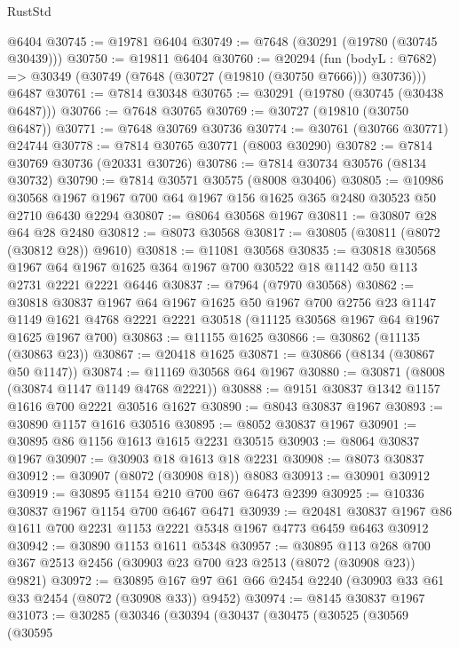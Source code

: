 \begin{lexlean}{RustStd}
\begin{coremodule}
    @6404
@30745 := @19781 @6404
@30749 := @7648 (@30291 (@19780 (@30745 @30439)))
@30750 := @19811 @6404
@30760 := @20294
    (fun (bodyL : @7682) => @30349 (@30749 (@7648 (@30727 (@19810 (@30750 @7666))) @30736)))
    @6487
@30761 := @7814 @30348
@30765 := @30291 (@19780 (@30745 (@30438 @6487)))
@30766 := @7648 @30765
@30769 := @30727 (@19810 (@30750 @6487))
@30771 := @7648 @30769 @30736
@30774 := @30761 (@30766 @30771) @24744
@30778 := @7814 @30765 @30771 (@8003 @30290)
@30782 := @7814 @30769 @30736 (@20331 @30726)
@30786 := @7814 @30734 @30576 (@8134 @30732)
@30790 := @7814 @30571 @30575 (@8008 @30406)
@30805 := @10986
    @30568
    @1967
    @1967
    @700
    @64
    @1967
    @156
    @1625
    @365
    @2480
    @30523
    @50
    @2710
    @6430
    @2294
@30807 := @8064 @30568 @1967
@30811 := @30807 @28 @64 @28 @2480
@30812 := @8073 @30568
@30817 := @30805 (@30811 (@8072 (@30812 @28)) @9610)
@30818 := @11081 @30568
@30835 := @30818
    @30568
    @1967
    @64
    @1967
    @1625
    @364
    @1967
    @700
    @30522
    @18
    @1142
    @50
    @113
    @2731
    @2221
    @2221
    @6446
@30837 := @7964 (@7970 @30568)
@30862 := @30818
    @30837
    @1967
    @64
    @1967
    @1625
    @50
    @1967
    @700
    @2756
    @23
    @1147
    @1149
    @1621
    @4768
    @2221
    @2221
    @30518
    (@11125 @30568 @1967 @64 @1967 @1625 @1967 @700)
@30863 := @11155 @1625
@30866 := @30862 (@11135 (@30863 @23))
@30867 := @20418 @1625
@30871 := @30866 (@8134 (@30867 @50 @1147))
@30874 := @11169 @30568 @64 @1967
@30880 := @30871 (@8008 (@30874 @1147 @1149 @4768 @2221))
@30888 := @9151 @30837 @1342 @1157 @1616 @700 @2221 @30516 @1627
@30890 := @8043 @30837 @1967
@30893 := @30890 @1157 @1616 @30516
@30895 := @8052 @30837 @1967
@30901 := @30895 @86 @1156 @1613 @1615 @2231 @30515
@30903 := @8064 @30837 @1967
@30907 := @30903 @18 @1613 @18 @2231
@30908 := @8073 @30837
@30912 := @30907 (@8072 (@30908 @18)) @8083
@30913 := @30901 @30912
@30919 := @30895 @1154 @210 @700 @67 @6473 @2399
@30925 := @10336 @30837 @1967 @1154 @700 @6467 @6471
@30939 := @20481 @30837 @1967 @86 @1611 @700 @2231 @1153 @2221 @5348 @1967 @4773 @6459 @6463 @30912
@30942 := @30890 @1153 @1611 @5348
@30957 := @30895
    @113
    @268
    @700
    @367
    @2513
    @2456
    (@30903 @23 @700 @23 @2513 (@8072 (@30908 @23)) @9821)
@30972 := @30895 @167 @97 @61 @66 @2454 @2240 (@30903 @33 @61 @33 @2454 (@8072 (@30908 @33)) @9452)
@30974 := @8145 @30837 @1967
@31073 := @30285
    (@30346
      (@30394
        (@30437
          (@30475
            (@30525
              (@30569
                (@30595

\end{coremodule}
\end{lexlean}
